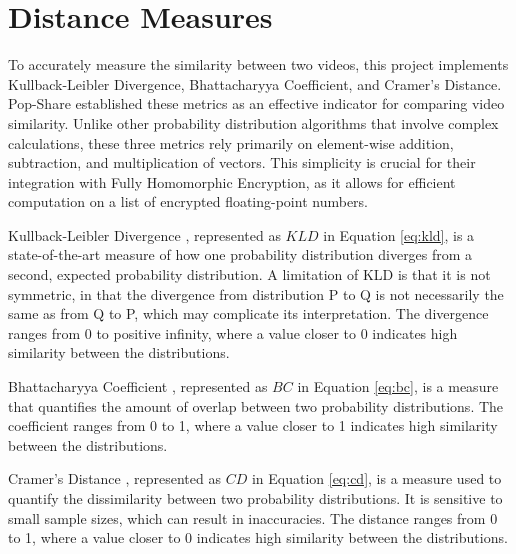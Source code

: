 \section{Distance Measures}
\label{sec:Background Distance Measures}
To accurately measure the similarity between two videos, this project implements Kullback-Leibler Divergence, Bhattacharyya Coefficient, and Cramer’s Distance. Pop-Share \cite{Lagesse2021-PopShare} established these metrics as an effective indicator for comparing video similarity. Unlike other probability distribution algorithms that involve complex calculations, these three metrics rely primarily on element-wise addition, subtraction, and multiplication of vectors. This simplicity is crucial for their integration with Fully Homomorphic Encryption, as it allows for efficient computation on a list of encrypted floating-point numbers.

Kullback-Leibler Divergence \cite{Kullback1951-bg}, represented as $KLD$ in Equation \ref{eq:kld}, is a state-of-the-art measure of how one probability distribution diverges from a second, expected probability distribution. A limitation of KLD is that it is not symmetric, in that the divergence from distribution P to Q is not necessarily the same as from Q to P, which may complicate its interpretation. The divergence ranges from 0 to positive infinity, where a value closer to 0 indicates high similarity between the distributions.



Bhattacharyya Coefficient \cite{Bhattacharyya1933-fw}, represented as $BC$ in Equation \ref{eq:bc}, is a measure that quantifies the amount of overlap between two probability distributions. The coefficient ranges from 0 to 1, where a value closer to 1 indicates high similarity between the distributions.



Cramer’s Distance \cite{Cramer1928-sw}, represented as $CD$ in Equation \ref{eq:cd}, is a measure used to quantify the dissimilarity between two probability distributions. It is sensitive to small sample sizes, which can result in inaccuracies. The distance ranges from 0 to 1, where a value closer to 0 indicates high similarity between the distributions.


